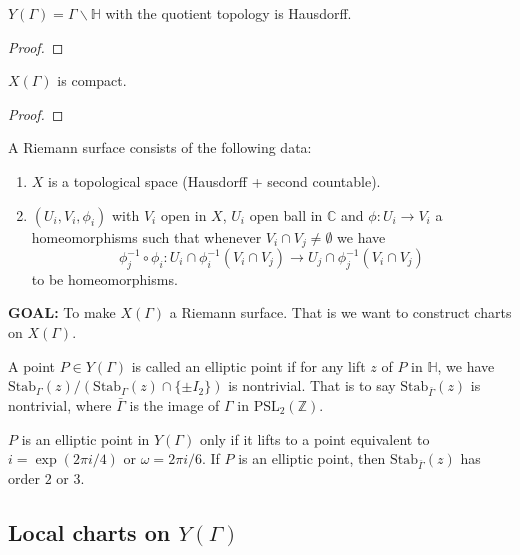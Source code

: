 \documentclass[oneside, 12pt]{scrbook}
\newcommand{\CC}{\mathbb C}
\newcommand{\ZZ}{\mathbb Z}
\newcommand{\HH}{\mathbb{H}}
\newcommand{\bs}{\backslash}
\newcommand{\Stab}{\mathrm{Stab}}
\theoremstyle{theorem}
\begin{document}
\begin{corollary}
$Y(\Gamma) = \Gamma \bs \HH$ with the quotient topology is Hausdorff.
\end{corollary}

\begin{proof}

\end{proof}

\begin{proposition}
$X(\Gamma)$ is compact.
\end{proposition}

\begin{proof}

\end{proof}



\begin{definition}
A Riemann surface consists of the following data: 
\begin{enumerate}
\item $X$ is a topological space (Hausdorff + second countable).
\item $(U_{i},V_{i}, \phi_{i})$ with $V_{i}$ open in $X$, $U_{i}$ open ball in $\CC$ and $\phi: U_{i} \rightarrow V_{i}$ a homeomorphisms such that whenever $V_{i} \cap V_{j} \neq \emptyset$ we have $$\phi_{j}^{-1} \circ \phi_{i} : U_{i} \cap \phi_{i}^{-1}(V_{i} \cap V_{j}) \rightarrow U_{j} \cap \phi_{j}^{-1} (V_{i} \cap V_{j})$$ to be homeomorphisms. 
\end{enumerate}
\end{definition}

\textbf{\textcolor{BrickRed}{GOAL}:} To make $X(\Gamma)$ a Riemann surface. That is we want to construct charts on $X(\Gamma)$.

\begin{definition}
A point $P \in Y(\Gamma)$ is called an elliptic point if for any lift $z$ of $P$ in $\HH$, we have $\Stab_{\Gamma}(z) / \left(  \Stab_{\Gamma}(z) \cap \{\pm I_{2}\} \right)$ is nontrivial. That is to say $\Stab_{\bar{\Gamma}}(z)$ is nontrivial, where $\bar{\Gamma}$ is the image of $\Gamma$ in $\mathrm{PSL}_{2}(\ZZ)$.
\end{definition}

$P$ is an elliptic point in $Y(\Gamma)$ only if it lifts to a point equivalent to $i = \exp(2 \pi i /4)$ or $\omega  = 2 \pi  i /6$. If $P$ is an elliptic point, then $\Stab_{\bar{\Gamma}}(z)$ has order $2$ or $3$. 

\subsection{Local charts on $Y(\Gamma)$}
\end{document}
